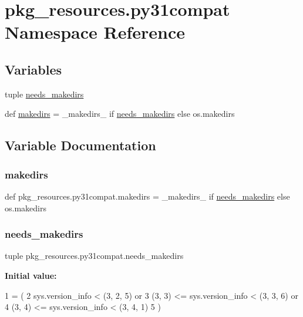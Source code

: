 \hypertarget{namespacepkg__resources_1_1py31compat}{}\section{pkg\+\_\+resources.\+py31compat Namespace Reference}
\label{namespacepkg__resources_1_1py31compat}
\subsection*{Variables}
\begin{DoxyCompactItemize}
\item 
tuple \hyperlink{namespacepkg__resources_1_1py31compat_a34f3346cfd3bc500d891716a864880f5}{needs\+\_\+makedirs}
\item 
def \hyperlink{namespacepkg__resources_1_1py31compat_adaa43170a8bde56096c2beec09a6ea7d}{makedirs} = \+\_\+makedirs\+\_ if \hyperlink{namespacepkg__resources_1_1py31compat_a34f3346cfd3bc500d891716a864880f5}{needs\+\_\+makedirs} else os.\+makedirs
\end{DoxyCompactItemize}


\subsection{Variable Documentation}
\mbox{\label{namespacepkg__resources_1_1py31compat_adaa43170a8bde56096c2beec09a6ea7d}} 
\subsubsection{\texorpdfstring{makedirs}{makedirs}}
{\footnotesize\ttfamily def pkg\+\_\+resources.\+py31compat.\+makedirs = \+\_\+makedirs\+\_ if \hyperlink{namespacepkg__resources_1_1py31compat_a34f3346cfd3bc500d891716a864880f5}{needs\+\_\+makedirs} else os.\+makedirs}

\mbox{\label{namespacepkg__resources_1_1py31compat_a34f3346cfd3bc500d891716a864880f5}} 
\subsubsection{\texorpdfstring{needs\+\_\+makedirs}{needs\_makedirs}}
{\footnotesize\ttfamily tuple pkg\+\_\+resources.\+py31compat.\+needs\+\_\+makedirs}

{\bfseries Initial value\+:}
\begin{DoxyCode}
1 =  (
2     sys.version\_info < (3, 2, 5) \textcolor{keywordflow}{or}
3     (3, 3) <= sys.version\_info < (3, 3, 6) \textcolor{keywordflow}{or}
4     (3, 4) <= sys.version\_info < (3, 4, 1)
5 )
\end{DoxyCode}
